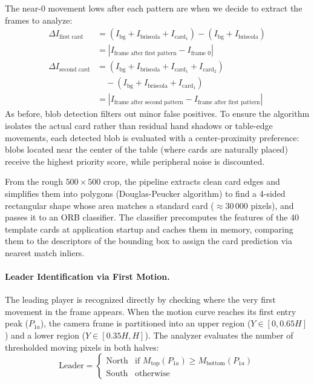 \documentclass[11pt,a4paper]{article}
\begin{document}
The near-0 movement lows after each pattern are when we decide to extract the
frames to analyze:
\begin{align}
    \Delta I_{\text{first card}} &= (I_{\text{bg}} + I_{\text{briscola}} + I_{\text{card}_1}) - (I_{\text{bg}} + I_{\text{briscola}}) \nonumber \\
    &= \left| I_{\text{frame after first pattern}} - I_{\text{frame 0}} \right| \\[6pt]
    \Delta I_{\text{second card}} &= (I_{\text{bg}} + I_{\text{briscola}} + I_{\text{card}_1} + I_{\text{card}_2}) \nonumber \\
    &\quad - (I_{\text{bg}} + I_{\text{briscola}} + I_{\text{card}_1}) \nonumber \\
    &= \left| I_{\text{frame after second pattern}} - I_{\text{frame after first pattern}} \right|
\end{align}
As before, blob detection filters out minor false positives. To ensure the algorithm isolates the actual card rather than residual hand shadows or table-edge movements, each detected blob is evaluated with a center-proximity preference: blobs located near the center of the table (where cards are naturally placed) receive the highest priority score, while peripheral noise is discounted.

From the rough $500 \times 500$ crop, the pipeline extracts clean card edges and simplifies them into polygons (Douglas-Peucker algorithm) to find a 4-sided rectangular shape whose area matches a standard card ($\approx 30\,000$ pixels), and passes it to an ORB classifier. The classifier precomputes the features of the 40 template cards at
application startup and caches them in memory, comparing them to the descriptors
of the bounding box to assign the card prediction via nearest match inliers.

\paragraph{Leader Identification via First Motion.}
The leading player is recognized directly by checking where the very first
movement in the frame appears. When the motion curve reaches its first entry
peak ($P_{1a}$), the camera frame is partitioned into an upper region
($Y \in [0, 0.65H]$) and a lower region ($Y \in [0.35H, H]$). The analyzer
evaluates the number of thresholded moving pixels in both halves:
\begin{equation}
    \text{Leader} =
    \begin{cases}
        \text{North} & \text{if } M_{\text{top}}(P_{1a}) \ge M_{\text{bottom}}(P_{1a}) \\
        \text{South} & \text{otherwise}
    \end{cases}
\end{equation}
\end{document}
